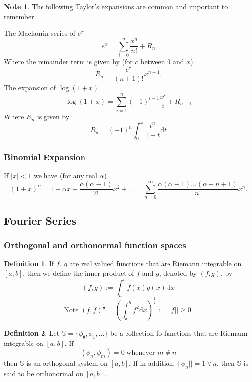 \documentclass[11pt,a4paper]{article}
\newcommand\dee{\text{d}}
\newcommand\sumOfSeries{\sum_{n = 0}^{\infty}}
\theoremstyle{definition}
\newtheorem{definition}{Definition}
\newtheorem{note}{Note}
\begin{document}
\begin{note}
    The following Taylor's expansions are common and important to remember.

    The Maclaurin series of $ e^x $
    \[ e^x = \sum_{i = 0}^n \frac{x^n}{n!} + R_n\]
    Where the remainder term is given by (for $ c $ between $ 0 $ and $ x $)
    \[ R_n = \frac{e^c}{(n + 1)!} x^{n + 1}.\]
    The expansion of $ \log (1 + x) $ 
    \[ \log(1 + x) = \sum_{i = 1}^n (-1)^{i - 1}\frac{x^i}{i} + R_{n + 1} \]
    Where $ R_n $ is given by 
    \[ R_n = (-1)^n \int_0^x \frac{t^n}{1 + t} \dee t\]
\end{note}

\subsubsection{Binomial Expansion}

If $ |x| < 1 $ we have (for any real $ \alpha $) 
\[ (1 + x)^\alpha = 1 + \alpha x + \frac{\alpha(\alpha - 1)}{2!}x^2 + ... = \sumOfSeries \frac{\alpha (\alpha - 1)...(\alpha - n + 1)}{n!} x^n.\]

\subsection{Fourier Series}

\subsubsection{Orthogonal and orthonormal function spaces}

\begin{definition}
    If $ f $, $ g $ are real valued functions that are Riemann integrable on $ [a, b] $, then we define the inner product of $ f $ and $ g $, denoted by $ (f, g) $, by
    \[ (f, g) := \int_a^b f(x)g(x) \, \dee x\]
    \[ \text{Note } (f, f)^\frac{1}{2} = \left(\int_a^b f^2 \dee x\right)^\frac{1}{2} := || f || \geq 0.\]
\end{definition}

\begin{definition}
    Let $ \mathbb{S} = \{ \phi_0, \phi_1, ... \} $ be a collection fo functions that are Riemann integrable on $ [a, b] $. If 
    \[ (\phi_n, \phi_m) = 0 \text{ whenever } m \neq n \]
    then $ \mathbb{S} $ is an orthogonal system on $ [a, b] $. If in addition, $ || \phi_n || = 1 \; \forall \, n $, then $ \mathbb{S} $ is said to be orthonormal on $ [a, b] $.
\end{definition}
\end{document}
